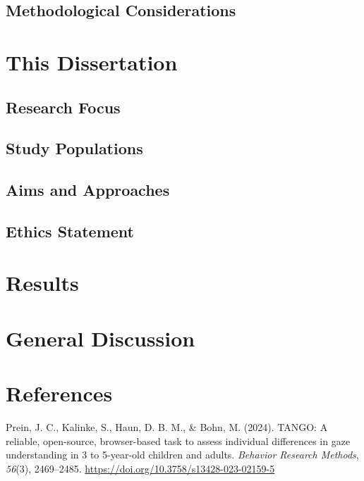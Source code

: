 \documentclass[
]{scrbook}
\newlength{\cslhangindent}
\newenvironment{CSLReferences}[2] %
 {\begin{list}{}{%
  \setlength{\itemindent}{0pt}
  \setlength{\leftmargin}{0pt}
  \setlength{\parsep}{0pt}
  \ifodd #1
   \setlength{\leftmargin}{\cslhangindent}
   \setlength{\itemindent}{-1\cslhangindent}
  \fi
  \setlength{\itemsep}{#2\baselineskip}}}
 {\end{list}}
\begin{document}
\section{Methodological Considerations}\label{methodological-considerations}

\chapter{This Dissertation}\label{aims}

\section{Research Focus}\label{research-focus}

\section{Study Populations}\label{study-populations}

\section{Aims and Approaches}\label{aims-and-approaches}

\section{Ethics Statement}\label{ethics-statement}

\chapter{Results}\label{results}

\chapter{General Discussion}\label{discussion}

\chapter*{References}\label{references}

\label{refs}
\begin{CSLReferences}{1}{0}
Prein, J. C., Kalinke, S., Haun, D. B. M., \& Bohn, M. (2024). {TANGO}: {A} reliable, open-source, browser-based task to assess individual differences in gaze understanding in 3 to 5-year-old children and adults. \emph{Behavior Research Methods}, \emph{56}(3), 2469--2485. \url{https://doi.org/10.3758/s13428-023-02159-5}

\end{CSLReferences}
\end{document}
